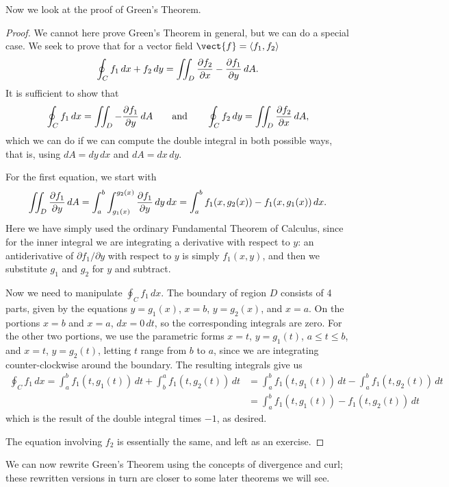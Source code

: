 Now we look at the proof of Green's Theorem.

\begin{proof}
We cannot here prove Green's Theorem in general, but we can do a
special case. We seek to prove that for a vector field $\vect{f} = \langle f_1, f_2 \rangle$
$$\oint_C f_1 \,dx + f_2\,dy = \iint_{D} {\partial f_2\over\partial x}
-{\partial f_1\over\partial y} \,dA.$$
It is sufficient to show that
$$\oint_C f_1 \,dx=\iint_{D}-{\partial f_1 \over\partial y} \,dA\qquad\hbox{and}
\qquad\oint_C f_2 \,dy=\iint_{D} {\partial f_2 \over\partial x}\,dA,$$
which we can do if we can compute the double integral in both possible
ways, that is, using $dA=dy\,dx$ and $dA=dx\,dy$.

For the first equation, we start with
$$\iint_{D}{\partial f_1\over\partial y}\,dA=
\int_a^b\int_{g_1(x)}^{g_2(x)} {\partial f_1\over \partial y}\,dy\,dx=
\int_a^b f_1(x,g_2(x))-f_1(x,g_1(x))\,dx.$$
Here we have simply used the ordinary Fundamental Theorem of Calculus,
since for the inner integral we are integrating a derivative with
respect to $y$: an antiderivative of $\partial f_1/\partial y$ with
respect to $y$ is simply $f_1(x,y)$, and then we substitute $g_1$ and
$g_2$ for $y$ and subtract.

Now we need to manipulate $\oint_C f_1\,dx$. The boundary of region $D$
consists of 4 parts, given by the equations $y=g_1(x)$, $x=b$,
$y=g_2(x)$, and $x=a$. On the portions $x=b$ and $x=a$, $dx=0\,dt$, so
the corresponding integrals are zero. For the other two portions, we
use the parametric forms $x=t$, $y=g_1(t)$, $a\le t\le b$, and
$x=t$, $y=g_2(t)$, letting $t$ range from $b$ to $a$, since we are
integrating counter-clockwise around the boundary.
The resulting integrals give us
\begin{align*}
\oint_C f_1\,dx = \int_a^b f_1(t,g_1(t))\,dt+\int_b^a f_1(t,g_2(t))\,dt
&=\int_a^b f_1(t,g_1(t))\,dt-\int_a^b f_1(t,g_2(t))\,dt	\\
&=\int_a^b f_1(t,g_1(t))-f_1(t,g_2(t))\,dt
\end{align*}
which is the result of the double integral times $-1$, as desired.

The equation involving $f_2$ is essentially the same, and left as an
exercise.
\end{proof}

We can now rewrite Green's Theorem using the concepts of divergence and curl; these rewritten
versions in turn are closer to some later theorems we will see.

